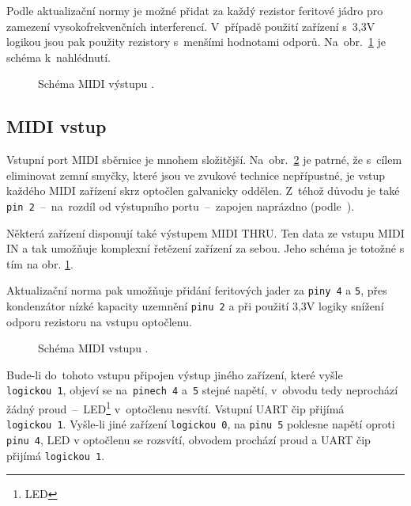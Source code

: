 Podle aktualizační normy \cite{MIDIupd} je možné přidat za každý rezistor feritové jádro pro zamezení vysokofrekvenčních interferencí. V~případě použití zařízení s~3,3\unit{V} logikou jsou pak použity rezistory s~menšími hodnotami odporů. Na~obr.~\ref{fig:schMIDIout} je schéma k~nahlédnutí.

\begin{figure}[h]
    \centering
    
    \caption{Schéma \acs{MIDI} výstupu \cite{MIDIspecs}.}
    \label{fig:schMIDIout}
\end{figure}

\subsection{MIDI vstup}



Vstupní port \acs{MIDI} sběrnice je mnohem složitější. Na~obr.~\ref{fig:schMIDIin} je patrné, že s~cílem eliminovat zemní smyčky, které jsou ve zvukové technice nepřípustné, je vstup každého \acs{MIDI} zařízení skrz optočlen galvanicky oddělen. Z~téhož důvodu je také \texttt{pin~2}~--~na~rozdíl od  výstupního portu~--~zapojen naprázdno (podle~\cite{MIDIspecs}). 

Některá zařízení disponují také výstupem \acs{MIDI} THRU. Ten  data ze vstupu \acs{MIDI} IN a tak umožňuje komplexní řetězení zařízení za sebou. Jeho schéma je totožné s tím na obr. \ref{fig:schMIDIout}.

Aktualizační norma \cite{MIDIupd} pak umožňuje přidání feritových jader za \texttt{piny 4} a \texttt{5}, přes kondenzátor nízké kapacity uzemnění \texttt{pinu 2} a při použití 3,3\unit{V} logiky snížení odporu rezistoru na vstupu optočlenu.

\begin{figure}[h]
    \centering
    
    \caption{Schéma MIDI vstupu \cite{MIDIspecs}.}
    \label{fig:schMIDIin}
\end{figure}

Bude-li do~tohoto vstupu připojen výstup jiného zařízení, které vyšle \linebreak \texttt{logickou~1}, objeví se na~\texttt{pinech~4} a~\texttt{5} stejné napětí, v~obvodu tedy neprochází žádný proud~--~\acs{LED}\footnote{\acl{LED}} v~optočlenu nesvítí. Vstupní UART čip přijímá \texttt{logickou~1}. Vyšle-li jiné zařízení \texttt{logickou 0}, na \texttt{pinu~5} poklesne napětí oproti \texttt{pinu~4}, \acs{LED} v optočlenu se rozsvítí, obvodem prochází proud a UART čip přijímá \texttt{logickou~1}.

